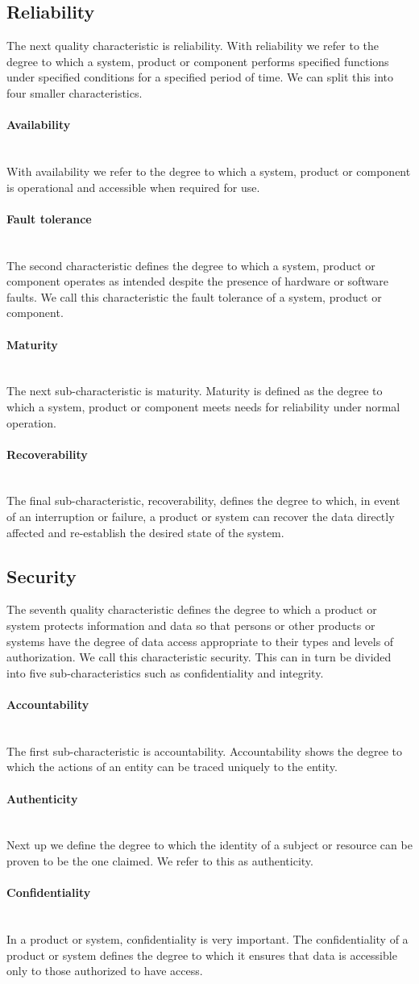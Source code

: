 \documentclass[twoside]{uva-inf-bachelor-thesis}
\newcommand{\myparagraph}[1]{\paragraph{#1}\mbox{}\\}
\begin{document}
\subsection{Reliability}
The next quality characteristic is reliability. With reliability we refer to the degree to which a system, product or component performs specified functions under specified conditions for a specified period of time. We can split this into four smaller characteristics.

\myparagraph{Availability}
With availability we refer to the degree to which a system, product or component is operational and accessible when required for use.

\myparagraph{Fault tolerance}
The second characteristic defines the degree to which a system, product or component operates as intended despite the presence of hardware or software faults. We call this characteristic the fault tolerance of a system, product or component.

\myparagraph{Maturity}
The next sub-characteristic is maturity. Maturity is defined as the degree to which a system, product or component meets needs for reliability under normal operation.

\myparagraph{Recoverability}
The final sub-characteristic, recoverability, defines the degree to which, in event of an interruption or failure, a product or system can recover the data directly affected and re-establish the desired state of the system.

\subsection{Security}
The seventh quality characteristic defines the degree to which a product or system protects information and data so that persons or other products or systems have the degree of data access appropriate to their types and levels of authorization. We call this characteristic security. This can in turn be divided into five sub-characteristics such as confidentiality and integrity.

\myparagraph{Accountability}
The first sub-characteristic is accountability. Accountability shows the degree to which the actions of an entity can be traced uniquely to the entity.

\myparagraph{Authenticity}
Next up we define the degree to which the identity of a subject or resource can be proven to be the one claimed. We refer to this as authenticity.

\myparagraph{Confidentiality}
In a product or system, confidentiality is very important. The confidentiality of a product or system defines the degree to which it ensures that data is accessible only to those authorized to have access.
\end{document}
